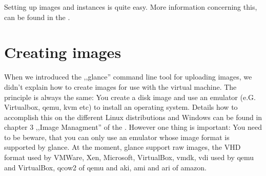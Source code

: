 \documentclass[a4paper,bibtotoc,english,liststotoc]{scrartcl}
\begin{document}
Setting up images and instances is quite easy. More information
concerning this, can be found in the \cite{hybridfoxMan}.

\section{Creating images}
\label{sec:creating-images}
When we introduced the ,,glance'' command line tool for uploading
images, we didn't explain how to create images for use with the
virtual machine. The principle is always the same: You create a disk
image and use an emulator (e.G. Virtualbox, qemu, kvm etc) to install
an operating system. Details how to accomplish this on  the different Linux
distributions and Windows can be found in chapter 3 ,,Image
Managment'' of the \cite{starterguide}. However one thing is important:
You need to be beware, that you can only use an emulator whose image
format is supported by glance. At the moment, glance support raw
images, the VHD format used by VMWare, Xen, Microsoft, VirtualBox,
vmdk, vdi used by qemu and VirtualBox, qcow2 of qemu and aki, ami and
ari of amazon.

%
\newpage
\printbibliography
 
\end{document}
